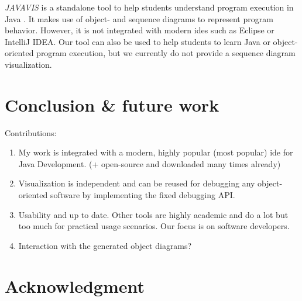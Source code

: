 \documentclass[conference]{IEEEtran}
\newcommand{\intellij}{IntelliJ IDEA}
\begin{document}
\textit{JAVAVIS} is a standalone tool to help students understand program execution in Java \cite{oechsleJAVAVISAutomaticProgram2002}.
It makes use of object- and sequence diagrams to represent program behavior.
However, it is not integrated with modern \glspl*{ide} such as Eclipse or \intellij{}.
Our tool can also be used to help students to learn Java or object-oriented program execution, but we currently do not provide a sequence diagram visualization.

\section{Conclusion \& future work} \label{sec:conclusion}
Contributions:
\begin{enumerate}
    \item My work is integrated with a modern, highly popular (most popular) \gls*{ide} for Java Development. (+ open-source and downloaded many times already)
    \item Visualization is independent and can be reused for debugging any object-oriented software by implementing the fixed debugging API.
    \item Usability and up to date. Other tools are highly academic and do a lot but too much for practical usage scenarios. Our focus is on software developers.
    \item Interaction with the generated object diagrams?
\end{enumerate}


\cite{krauterBehavioralConsistencyHeterogeneous2021}

\section*{Acknowledgment}

\newpage



\end{document}
